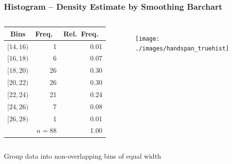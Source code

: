 \begin{frame}
\frametitle{Histogram -- Density Estimate by Smoothing Barchart}
\footnotesize
\singlespacing

\begin{columns}
\begin{tabular}{crr}
Bins & Freq.\ & Rel.\ Freq.\ \\
\hline
 $[14,16)$&1& 0.01\\
 $[16,18)$&6& 0.07\\
 $[18,20)$&26&0.30 \\
 $[20,22)$&26&0.30 \\
 $[22,24)$&21&0.24 \\
 $[24,26)$&7&0.08 \\
 $[26,28)$&1&0.01\\
 \hline
 & $n=88$&1.00
\end{tabular}
\begin{figure}
	\centering
	\texttt{[image: ./images/handspan\_truehist]}
\end{figure}
\end{columns}

    \alert{Group data into non-overlapping bins of equal width}
\end{frame}

